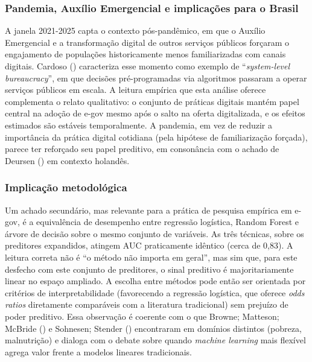 \documentclass[
  man,
  floatsintext,
  longtable,
  a4paper,
  nolmodern,
  notxfonts,
  notimes,
  colorlinks=true,linkcolor=blue,citecolor=blue,urlcolor=blue]{apa7}
\begin{document}
\subsubsection{Pandemia, Auxílio Emergencial e implicações para o
Brasil}\label{pandemia-auxuxedlio-emergencial-e-implicauxe7uxf5es-para-o-brasil}

A janela 2021-2025 capta o contexto pós-pandêmico, em que o Auxílio
Emergencial e a transformação digital de outros serviços públicos
forçaram o engajamento de populações historicamente menos familiarizadas
com canais digitais. Cardoso ()
caracteriza esse momento como exemplo de ``\emph{system-level
bureaucracy}'', em que decisões pré-programadas via algoritmos passaram
a operar serviços públicos em escala. A leitura empírica que esta
análise oferece complementa o relato qualitativo: o conjunto de práticas
digitais mantém papel central na adoção de e-gov mesmo após o salto na
oferta digitalizada, e os efeitos estimados são estáveis temporalmente.
A pandemia, em vez de reduzir a importância da prática digital cotidiana
(pela hipótese de familiarização forçada), parece ter reforçado seu
papel preditivo, em consonância com o achado de Deursen
() em contexto holandês.

\subsubsection{Implicação
metodológica}\label{implicauxe7uxe3o-metodoluxf3gica}

Um achado secundário, mas relevante para a prática de pesquisa empírica
em e-gov, é a equivalência de desempenho entre regressão logística,
Random Forest e árvore de decisão sobre o mesmo conjunto de variáveis.
As três técnicas, sobre os preditores expandidos, atingem AUC
praticamente idêntico (cerca de 0,83). A leitura correta não é ``o
método não importa em geral'', mas sim que, para este desfecho com este
conjunto de preditores, o sinal preditivo é majoritariamente linear no
espaço ampliado. A escolha entre métodos pode então ser orientada por
critérios de interpretabilidade (favorecendo a regressão logística, que
oferece \emph{odds ratios} diretamente comparáveis com a literatura
tradicional) sem prejuízo de poder preditivo. Essa observação é coerente
com o que Browne; Matteson; McBride
() e Sohnesen; Stender
() encontraram em domínios
distintos (pobreza, malnutrição) e dialoga com o debate sobre quando
\emph{machine learning} mais flexível agrega valor frente a modelos
lineares tradicionais.
\end{document}
